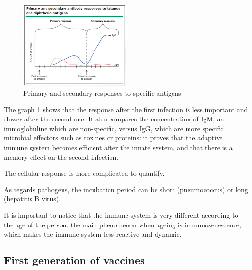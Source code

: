 \documentclass{article}
\begin{document}
\begin{itemize}
                            \begin{figure}
                                \centering
                                \includegraphics[width=0.5\textwidth]{imgs/PrimarySecondaryResponses.JPG}
                                \caption{Primary and secondary responses to specific antigens \autocite{pinkComparisonImmunityGeneral}}
                                \label{fig:responses}
                            \end{figure}

                        The graph \ref{fig:responses} shows that the response after the first infection is less important and slower after the second one.
                        It also compares the concentration of IgM, an immoglobuline which are non-specific, 
                            versus IgG, which are more specific microbial effectors such as toxines or proteins:
                            it proves that the adaptive immune system becomes efficient after the innate system, and that there is a memory effect on the second infection.


                        The cellular response is more complicated to quantify.

                        As regards pathogens, the incubation period can be short (pneumococcus) or long (hepatitis B virus).

                        It is important to notice that the immune system is very different according to the age of the person: the main phenomenon when ageing is immunosenescence,
                            which makes the immune system less reactive and dynamic.
                \end{itemize}
              
        \subsection{First generation of vaccines}
            
\end{document}
